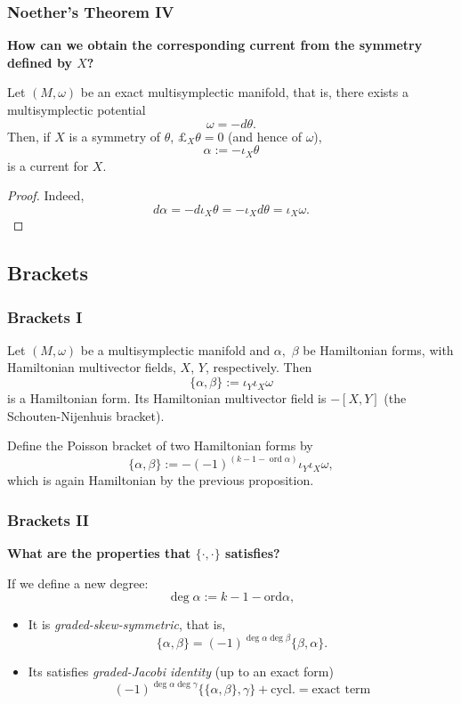 \begin{frame}
    \frametitle{Noether's Theorem IV}
    {\large \bf How can we obtain the corresponding current from the symmetry defined by $X$?}
    \begin{theorem} Let $(M, \omega)$ be an \alert{exact} multisymplectic manifold, that is, there exists a \alert{multisymplectic potential}
        $$\omega = - d \theta.$$ Then, if $X$ is a symmetry of $\theta$, $\pounds_X \theta = 0$ (and hence of $\omega$), $$\alpha := - \iota_X \theta$$
        is a current for $X$.
    \end{theorem}
    \begin{proof} Indeed, $$d \alpha = - d \iota_X \theta = - \iota_X d \theta = \iota_X \omega.$$
    \end{proof}
\end{frame}

\subsection{Brackets}
\begin{frame}
    \frametitle{Brackets I}
    \begin{proposition} Let $(M, \omega)$ be a multisymplectic manifold and $\alpha,$ $\beta$ be Hamiltonian forms,
        with Hamiltonian multivector fields, $X$, $Y$, respectively. Then $$\{\alpha, \beta\} := \iota_Y \iota_X \omega$$ is a Hamiltonian form. Its
        Hamiltonian multivector field is $-[X, Y]$ (the Schouten-Nijenhuis bracket).
    \end{proposition}

    \begin{definition}
        Define the \alert{Poisson bracket} of two Hamiltonian forms by $$\{\alpha, \beta\} := -(-1)^{(k - 1 -\operatorname{ord} \alpha )}\iota_Y \iota_X \omega,$$ which is again
        Hamiltonian by the previous proposition.
    \end{definition}
\end{frame}

\begin{frame}
    \frametitle{Brackets II}
    \begin{center}
        {\large \bf What are the properties that $\{\cdot, \cdot\}$ satisfies?}
    \end{center}
    If we define a new degree: $$\deg \alpha:= k -1 - \text{ord} \alpha,$$

    \begin{itemize}
        \item It is \alert{\textit{graded-skew-symmetric}}, that is, $$\{\alpha, \beta\} = (-1)^{\deg \alpha\deg \beta} \{\beta, \alpha\}.$$
        \item Its satisfies \alert{\textit{graded-Jacobi identity}} (up to an exact form) 
        $$(-1)^{\deg \alpha \deg \gamma}\{\{\alpha, \beta\}, \gamma\} + \text{cycl.} = \text{exact term}$$
    \end{itemize}
\end{frame}

